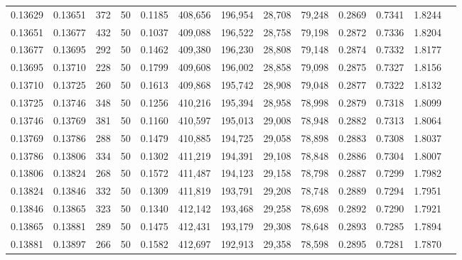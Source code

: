 \begin{tabular}{rrrrrrrrrrrrr}
0.13629 & 0.13651 &   372 &  50 &                                     0.1185 & 408,656 & 196,954 &  28,708 &  79,248 & 0.2869 & 0.7341 & 1.8244 \\
0.13651 & 0.13677 &   432 &  50 &                                     0.1037 & 409,088 & 196,522 &  28,758 &  79,198 & 0.2872 & 0.7336 & 1.8204 \\
0.13677 & 0.13695 &   292 &  50 &                                     0.1462 & 409,380 & 196,230 &  28,808 &  79,148 & 0.2874 & 0.7332 & 1.8177 \\
0.13695 & 0.13710 &   228 &  50 &                                     0.1799 & 409,608 & 196,002 &  28,858 &  79,098 & 0.2875 & 0.7327 & 1.8156 \\
0.13710 & 0.13725 &   260 &  50 &                                     0.1613 & 409,868 & 195,742 &  28,908 &  79,048 & 0.2877 & 0.7322 & 1.8132 \\
0.13725 & 0.13746 &   348 &  50 &                                     0.1256 & 410,216 & 195,394 &  28,958 &  78,998 & 0.2879 & 0.7318 & 1.8099 \\
0.13746 & 0.13769 &   381 &  50 &                                     0.1160 & 410,597 & 195,013 &  29,008 &  78,948 & 0.2882 & 0.7313 & 1.8064 \\
0.13769 & 0.13786 &   288 &  50 &                                     0.1479 & 410,885 & 194,725 &  29,058 &  78,898 & 0.2883 & 0.7308 & 1.8037 \\
0.13786 & 0.13806 &   334 &  50 &                                     0.1302 & 411,219 & 194,391 &  29,108 &  78,848 & 0.2886 & 0.7304 & 1.8007 \\
0.13806 & 0.13824 &   268 &  50 &                                     0.1572 & 411,487 & 194,123 &  29,158 &  78,798 & 0.2887 & 0.7299 & 1.7982 \\
0.13824 & 0.13846 &   332 &  50 &                                     0.1309 & 411,819 & 193,791 &  29,208 &  78,748 & 0.2889 & 0.7294 & 1.7951 \\
0.13846 & 0.13865 &   323 &  50 &                                     0.1340 & 412,142 & 193,468 &  29,258 &  78,698 & 0.2892 & 0.7290 & 1.7921 \\
0.13865 & 0.13881 &   289 &  50 &                                     0.1475 & 412,431 & 193,179 &  29,308 &  78,648 & 0.2893 & 0.7285 & 1.7894 \\
0.13881 & 0.13897 &   266 &  50 &                                     0.1582 & 412,697 & 192,913 &  29,358 &  78,598 & 0.2895 & 0.7281 & 1.7870 \\

\end{tabular}
